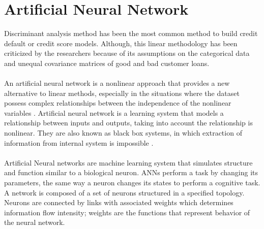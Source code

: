\documentclass{article}[]
\begin{document}
\section{Artificial Neural Network}
Discriminant analysis method has been the most common method to build credit default or credit score models. Although, this linear methodology has been criticized by the researchers because of its assumptions on the categorical data and unequal covariance matrices of good and bad customer loans.\\\\
An artificial neural network is a nonlinear approach that provides a new alternative to linear methods, especially in the situations where the dataset possess complex relationships between the independence of the nonlinear variables \cite{atiya2001bankruptcy} \cite{pang2002credit}. Artificial neural network is a learning system that models a relationship between inputs and outputs, taking into account the relationship is nonlinear. They are also known as black box systems, in which extraction of information from internal system is impossible \cite{angelini2008neural}.\\\\
Artificial Neural networks are machine learning system that simulates structure and function similar to a biological neuron. ANNs perform a task by changing its parameters, the same way a neuron changes its states to perform a cognitive task. A network is composed of a set of neurons structured in a specified topology. Neurons are connected by links with associated weights which determines information flow intensity; weights are the functions that represent behavior of the neural network.\\\\
\end{document}
